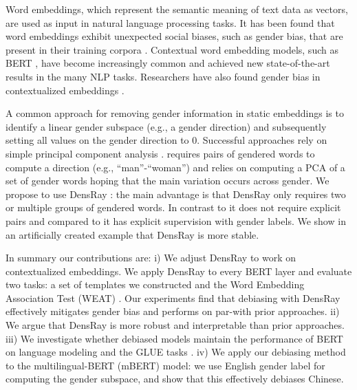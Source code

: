 Word embeddings, which represent the semantic meaning of text data as vectors, are used as input in natural language processing tasks. It has been found that word embeddings exhibit unexpected social biases, such as gender bias, that are present in their training corpora \citep{bolukbasi2016man, caliskan2017semantics,garg2018word}. Contextual word embedding models, such as BERT \citep{devlin2018bert}, have become increasingly common and achieved new state-of-the-art results in the many NLP tasks. Researchers have also found gender bias in contextualized embeddings \citep{zhao2019gender,may2019measuring}.

A common approach for removing gender information in static embeddings is to identify a linear gender subspace (e.g., a gender direction) and subsequently setting all values on the gender direction to 0. Successful approaches rely on simple principal component analysis \cite{bolukbasi2016man,mu2018all}. \citet{bolukbasi2016man} requires pairs of gendered words to compute a direction (e.g., ``man''-``woman'') and \citet{mu2018all} relies on computing a PCA of a set of gender words hoping that the main variation occurs across gender. We propose to use DensRay \citep{dufter2019analytical}: the main advantage is that DensRay only requires two or multiple groups of gendered words. In contrast to \cite{bolukbasi2016man} it does not require explicit pairs and compared to \cite{mu2018all} it has explicit supervision with gender labels. We show in an artificially created example that DensRay is more stable. 

In summary our contributions are: i) We adjust DensRay to work on contextualized embeddings. 
 We apply DensRay to every BERT layer and evaluate two tasks: a set of templates we constructed and the Word Embedding Association Test (WEAT) \citep{caliskan2017semantics}. Our experiments find that debiasing with DensRay effectively mitigates gender bias and performs on par-with prior approaches. ii) We argue that DensRay is more robust and interpretable than prior approaches.
iii) We investigate whether debiased models maintain the performance of BERT on language modeling and the GLUE tasks \citep{wang2018glue}. iv) We apply our debiasing method to the multilingual-BERT (mBERT) model: we use English gender label for computing the gender subspace, and show that this effectively debiases Chinese. 